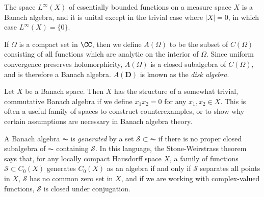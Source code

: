 \begin{example}
    The space $L^\infty(X)$ of essentially bounded functions on a measure space $X$ is a Banach algebra, and it is unital except in the trivial case where $|X| = 0$, in which case $L^\infty(X) = \{ 0 \}$.
\end{example}

\begin{example}
    If $\Omega$ is a compact set in $\CC$, then we define $A(\Omega)$ to be the subset of $C(\Omega)$ consisting of all functions which are analytic on the interior of $\Omega$. Since uniform convergence preserves holomorphicity, $A(\Omega)$ is a closed subalgebra of $C(\Omega)$, and is therefore a Banach algebra. $A(\mathbf{D})$ is known as the \emph{disk algebra}.
\end{example}

\begin{example}
    Let $X$ be a Banach space. Then $X$ has the structure of a somewhat trivial, commutative Banach algebra if we define $x_1 x_2 = 0$ for any $x_1,x_2 \in X$. This is often a useful family of spaces to construct counterexamples, or to show why certain assumptions are necessary in Banach algebra theory.
\end{example}

A Banach algebra $\AC$ is \emph{generated} by a set $\mathcal{S} \subset \AC$ if there is no proper closed subalgebra of $\AC$ containing $\mathcal{S}$. In this language, the Stone-Weirstrass theorem says that, for any locally compact Hausdorff space $X$, a family of functions $\mathcal{S} \subset C_0(X)$ generates $C_0(X)$ as an algebra if and only if $\mathcal{S}$ separates all points in $X$, $\mathcal{S}$ has no common zero set in $X$, and if we are working with complex-valued functions, $\mathcal{S}$ is closed under conjugation.

